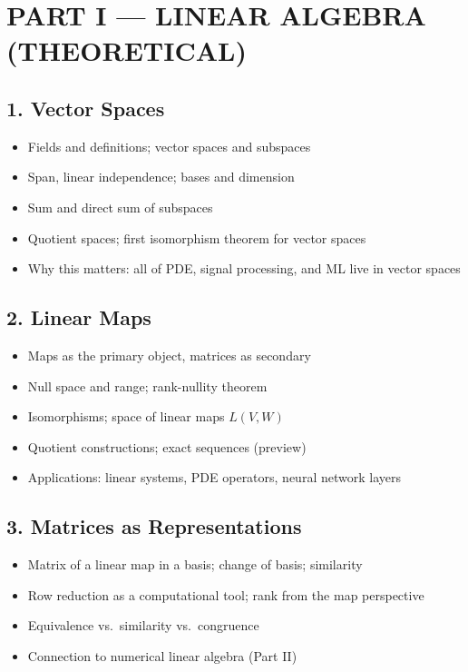 \section{PART I --- LINEAR ALGEBRA (THEORETICAL)}

\subsection{1. Vector Spaces}
\begin{itemize}
\item Fields and definitions; vector spaces and subspaces
\item Span, linear independence; bases and dimension
\item Sum and direct sum of subspaces
\item Quotient spaces; first isomorphism theorem for vector spaces
\item Why this matters: all of PDE, signal processing, and ML live in vector spaces
\end{itemize}

\subsection{2. Linear Maps}
\begin{itemize}
\item Maps as the primary object, matrices as secondary
\item Null space and range; rank-nullity theorem
\item Isomorphisms; space of linear maps $L(V,W)$
\item Quotient constructions; exact sequences (preview)
\item Applications: linear systems, PDE operators, neural network layers
\end{itemize}

\subsection{3. Matrices as Representations}
\begin{itemize}
\item Matrix of a linear map in a basis; change of basis; similarity
\item Row reduction as a computational tool; rank from the map perspective
\item Equivalence vs.\ similarity vs.\ congruence
\item Connection to numerical linear algebra (Part II)
\end{itemize}

